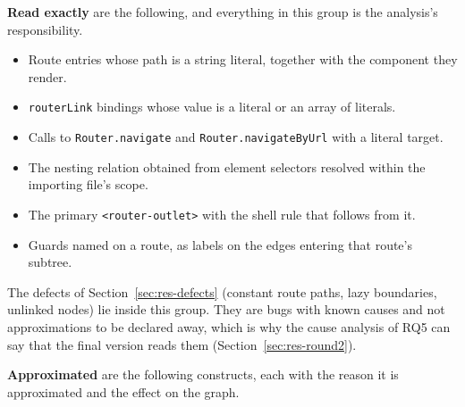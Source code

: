 \textbf{Read exactly} are the following, and everything in this group is the analysis's
responsibility.
\begin{itemize}[nosep]
\item Route entries whose path is a string literal, together with the component they render.
\item \texttt{routerLink} bindings whose value is a literal or an array of literals.
\item Calls to \texttt{Router.navigate} and \texttt{Router.navigateByUrl} with a literal target.
\item The nesting relation obtained from element selectors resolved within the importing file's
scope.
\item The primary \texttt{<router-outlet>} with the shell rule that follows from it.
\item Guards named on a route, as labels on the edges entering that route's subtree.
\end{itemize}
The defects of Section~\ref{sec:res-defects} (constant route paths, lazy boundaries, unlinked nodes) lie inside this group.
They are bugs with known causes and not approximations to be declared away, which is why the cause
analysis of RQ5 can say that the final version reads them (Section~\ref{sec:res-round2}).

\textbf{Approximated} are the following constructs, each with the reason it is approximated and
the effect on the graph.

